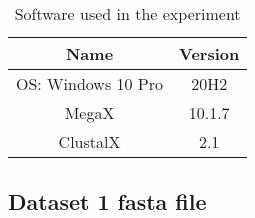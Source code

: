 \documentclass[en,black,12pt,normal]{elegantnote}
\begin{document}
\begin{table}[H]
    \caption{Software used in the experiment}
    \centering
    \begin{tabular}{cc}
        \toprule
        Name&Version\\
        \midrule
        OS: Windows 10 Pro&20H2\\
        MegaX&10.1.7\\
        ClustalX&2.1\\
        \bottomrule
    \end{tabular}
\end{table}

\subsection{Dataset 1 fasta file}
\lstset{basicstyle=\tiny\ttfamily}
\end{document}
